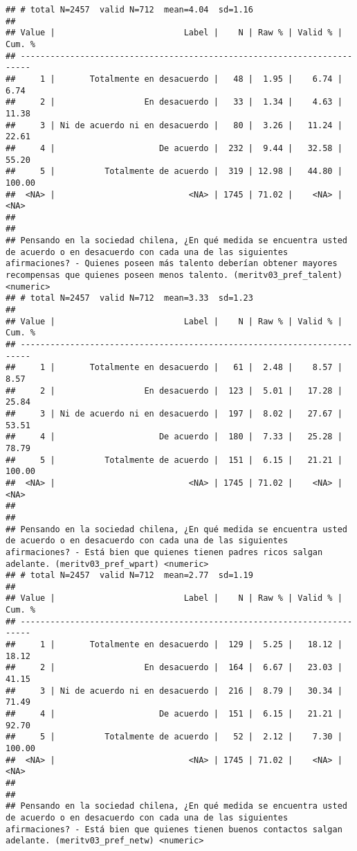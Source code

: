 \documentclass[
  10,
  landscape,
  legalpaper]{article}
\begin{document}
\begin{verbatim}
## # total N=2457  valid N=712  mean=4.04  sd=1.16
## 
## Value |                          Label |    N | Raw % | Valid % | Cum. %
## ------------------------------------------------------------------------
##     1 |       Totalmente en desacuerdo |   48 |  1.95 |    6.74 |   6.74
##     2 |                  En desacuerdo |   33 |  1.34 |    4.63 |  11.38
##     3 | Ni de acuerdo ni en desacuerdo |   80 |  3.26 |   11.24 |  22.61
##     4 |                     De acuerdo |  232 |  9.44 |   32.58 |  55.20
##     5 |          Totalmente de acuerdo |  319 | 12.98 |   44.80 | 100.00
##  <NA> |                           <NA> | 1745 | 71.02 |    <NA> |   <NA>
## 
## 
## Pensando en la sociedad chilena, ¿En qué medida se encuentra usted de acuerdo o en desacuerdo con cada una de las siguientes afirmaciones? - Quienes poseen más talento deberían obtener mayores recompensas que quienes poseen menos talento. (meritv03_pref_talent) <numeric>
## # total N=2457  valid N=712  mean=3.33  sd=1.23
## 
## Value |                          Label |    N | Raw % | Valid % | Cum. %
## ------------------------------------------------------------------------
##     1 |       Totalmente en desacuerdo |   61 |  2.48 |    8.57 |   8.57
##     2 |                  En desacuerdo |  123 |  5.01 |   17.28 |  25.84
##     3 | Ni de acuerdo ni en desacuerdo |  197 |  8.02 |   27.67 |  53.51
##     4 |                     De acuerdo |  180 |  7.33 |   25.28 |  78.79
##     5 |          Totalmente de acuerdo |  151 |  6.15 |   21.21 | 100.00
##  <NA> |                           <NA> | 1745 | 71.02 |    <NA> |   <NA>
## 
## 
## Pensando en la sociedad chilena, ¿En qué medida se encuentra usted de acuerdo o en desacuerdo con cada una de las siguientes afirmaciones? - Está bien que quienes tienen padres ricos salgan adelante. (meritv03_pref_wpart) <numeric>
## # total N=2457  valid N=712  mean=2.77  sd=1.19
## 
## Value |                          Label |    N | Raw % | Valid % | Cum. %
## ------------------------------------------------------------------------
##     1 |       Totalmente en desacuerdo |  129 |  5.25 |   18.12 |  18.12
##     2 |                  En desacuerdo |  164 |  6.67 |   23.03 |  41.15
##     3 | Ni de acuerdo ni en desacuerdo |  216 |  8.79 |   30.34 |  71.49
##     4 |                     De acuerdo |  151 |  6.15 |   21.21 |  92.70
##     5 |          Totalmente de acuerdo |   52 |  2.12 |    7.30 | 100.00
##  <NA> |                           <NA> | 1745 | 71.02 |    <NA> |   <NA>
## 
## 
## Pensando en la sociedad chilena, ¿En qué medida se encuentra usted de acuerdo o en desacuerdo con cada una de las siguientes afirmaciones? - Está bien que quienes tienen buenos contactos salgan adelante. (meritv03_pref_netw) <numeric>

\end{verbatim}
\end{document}
